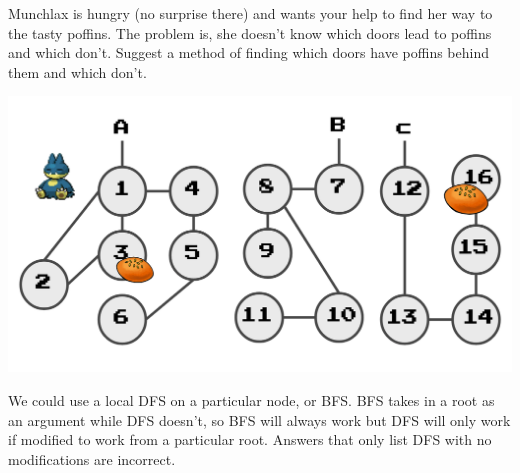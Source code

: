 
\question Munchlax is hungry (no surprise there) and wants your help to find her way to the tasty poffins. The problem is, she doesn't know which doors lead to poffins and which don't. Suggest a method of finding which doors have poffins behind them and which don't. 

\includegraphics[scale = 0.5]{topics/graphs/images/munch-graph.png}

\begin{solution}
We could use a local DFS on a particular node, or BFS. BFS takes in a root as an argument while DFS doesn't, so BFS will always work but DFS will only work if modified to work from a particular root. Answers that only list DFS with no modifications are incorrect.  
\end{solution}
\vspace{45mm}



